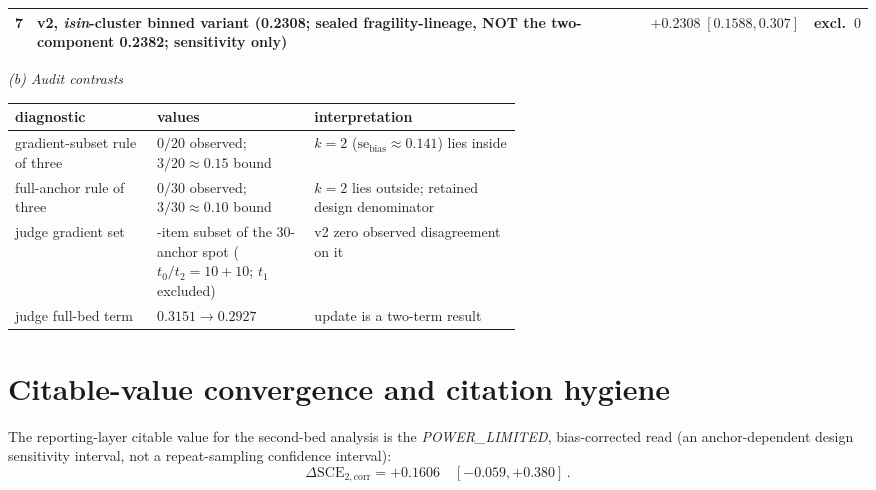 \documentclass{article}
\begin{document}
\begin{table}[!b]
\begin{tabularx}{\linewidth}{@{}r>{\raggedright\arraybackslash}Xll@{}}
7 & v2, \emph{isin}-cluster binned variant (0.2308; sealed fragility-lineage, NOT the two-component 0.2382; sensitivity only) & $+0.2308\;[0.1588,0.307]$ & excl.\ $0$\\
\bottomrule
\end{tabularx}
\smallskip
\textit{(b) Audit contrasts}\par\smallskip
\begin{tabularx}{\linewidth}{@{}>{\raggedright\arraybackslash}p{0.28\linewidth}>{\raggedright\arraybackslash}p{0.31\linewidth}X@{}}
\toprule
diagnostic & values & interpretation \\
\midrule
gradient-subset rule of three & $0/20$ observed; $3/20\approx0.15$ bound & $k{=}2$ ($\mathrm{se_{bias}}\approx0.141$) lies inside \\
full-anchor rule of three & $0/30$ observed; $3/30\approx0.10$ bound & $k{=}2$ lies outside; retained design denominator \\
judge gradient set & 20-item subset of the 30-anchor spot ($t_0/t_2{=}10{+}10$; $t_1$ excluded) & v2 zero observed disagreement on it \\
judge full-bed term & $0.3151\to0.2927$ & update is a two-term result \\
\bottomrule
\end{tabularx}
\end{table}

\section{Citable-value convergence and citation hygiene}
\label{sec:converge}

The reporting-layer citable value for the second-bed analysis is the
\emph{POWER\_LIMITED}, bias-corrected read (an anchor-dependent design sensitivity interval, not a repeat-sampling confidence interval):
\[
\Delta\mathrm{SCE}_{2,\mathrm{corr}}=+0.1606\quad [-0.059,+0.380]
\,.
\]
\end{document}

